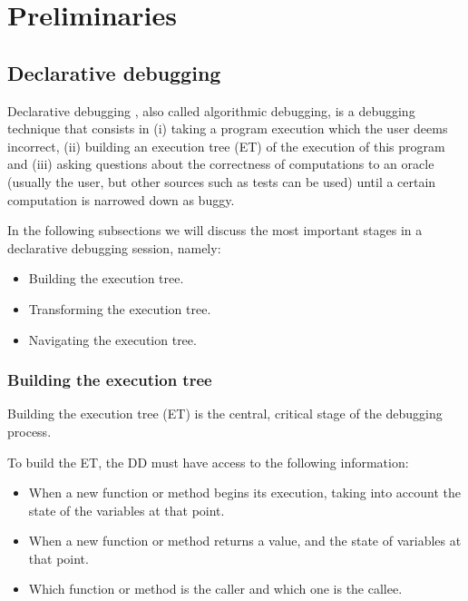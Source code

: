 \chapter{Preliminaries}
\label{cap:preliminares}

\section{Declarative debugging}
Declarative debugging \cite{shapiro1982algorithmic}, also called algorithmic debugging, is a debugging technique that consists in (i) taking a program execution which the user deems incorrect, (ii) building an execution tree (ET) of the execution of this program and (iii) asking questions about the correctness of computations to an oracle (usually the user, but other sources such as tests can be used) until a certain computation is narrowed down as buggy.


In the following subsections we will discuss the most important stages in a declarative debugging session, namely:
\begin{itemize}
    \item Building the execution tree.
    \item Transforming the execution tree.
    \item Navigating the execution tree.
\end{itemize}
\subsection{Building the execution tree}

Building the execution tree (ET) is the central, critical stage of the debugging process.

To build the ET, the DD must have access to the following information:
\begin{itemize}
    \item When a new function or method begins its execution, taking into account the state of the variables at that point. 
    \item When a new function or method returns a value, and the state of variables at that point.
    \item Which function or method is the caller and which one is the callee. 
\end{itemize}

